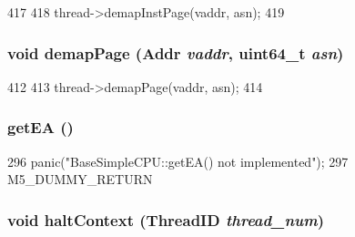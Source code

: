 \begin{DoxyCode}
417     {
418         thread->demapInstPage(vaddr, asn);
419     }
\end{DoxyCode}
\hypertarget{classBaseSimpleCPU_a2d698ff909513b48a1263f8a5440e067}{
\subsubsection[{demapPage}]{\setlength{\rightskip}{0pt plus 5cm}void demapPage ({\bf Addr} {\em vaddr}, \/  uint64\_\-t {\em asn})}}
\label{classBaseSimpleCPU_a2d698ff909513b48a1263f8a5440e067}



\begin{DoxyCode}
412     {
413         thread->demapPage(vaddr, asn);
414     }
\end{DoxyCode}
\hypertarget{classBaseSimpleCPU_a840be0f7fe0a7a50b37b0552fe6ca506}{
\subsubsection[{getEA}]{ getEA ()}}
\label{classBaseSimpleCPU_a840be0f7fe0a7a50b37b0552fe6ca506}



\begin{DoxyCode}
296                         { panic("BaseSimpleCPU::getEA() not implemented\n");
297         M5_DUMMY_RETURN}
\end{DoxyCode}
\hypertarget{classBaseSimpleCPU_ab39525f324a8a93139e17327f6ccde10}{
\subsubsection[{haltContext}]{\setlength{\rightskip}{0pt plus 5cm}void haltContext ({\bf ThreadID} {\em thread\_\-num})}}
\label{classBaseSimpleCPU_ab39525f324a8a93139e17327f6ccde10}



